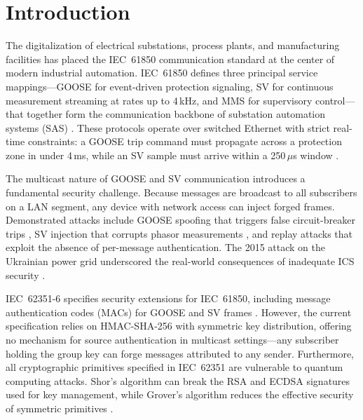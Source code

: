 \documentclass[conference,10pt]{IEEEtran}
\newcommand{\GOOSE}{\textsf{GOOSE}}
\newcommand{\SV}{\textsf{SV}}
\newcommand{\MMS}{\textsf{MMS}}
\begin{document}
\section{Introduction}
\label{sec:introduction}

The digitalization of electrical substations, process plants, and manufacturing facilities has placed the IEC~61850 communication standard at the center of modern industrial automation. IEC~61850 defines three principal service mappings---\GOOSE{} for event-driven protection signaling, \SV{} for continuous measurement streaming at rates up to 4\,kHz, and \MMS{} for supervisory control---that together form the communication backbone of substation automation systems (SAS) \cite{iec61850-1,iec61850-7-2}. These protocols operate over switched Ethernet with strict real-time constraints: a \GOOSE{} trip command must propagate across a protection zone in under 4\,ms, while an \SV{} sample must arrive within a 250\,$\mu$s window \cite{iec61850-9-2}.

The multicast nature of \GOOSE{} and \SV{} communication introduces a fundamental security challenge. Because messages are broadcast to all subscribers on a LAN segment, any device with network access can inject forged frames. Demonstrated attacks include \GOOSE{} spoofing that triggers false circuit-breaker trips \cite{hoyos2012goose}, \SV{} injection that corrupts phasor measurements \cite{hong2014goose}, and replay attacks that exploit the absence of per-message authentication. The 2015 attack on the Ukrainian power grid underscored the real-world consequences of inadequate ICS security \cite{case2016ukraine}.

IEC~62351-6 specifies security extensions for IEC~61850, including message authentication codes (MACs) for \GOOSE{} and \SV{} frames \cite{iec62351-6}. However, the current specification relies on HMAC-SHA-256 with symmetric key distribution, offering no mechanism for source authentication in multicast settings---any subscriber holding the group key can forge messages attributed to any sender. Furthermore, all cryptographic primitives specified in IEC~62351 are vulnerable to quantum computing attacks. Shor's algorithm can break the RSA and ECDSA signatures used for key management, while Grover's algorithm reduces the effective security of symmetric primitives \cite{bernstein2017pqcrypto,mosca2018quantum}.
\end{document}
